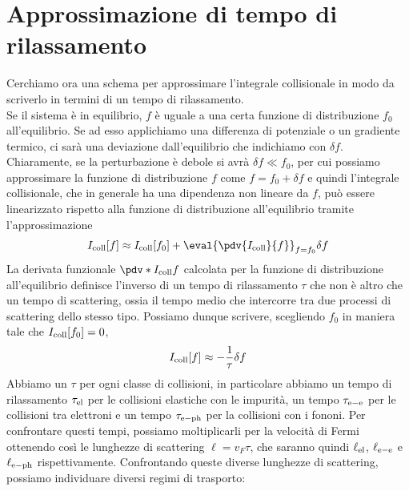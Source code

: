 \section{Approssimazione di tempo di rilassamento}
Cerchiamo ora una schema per approssimare l'integrale collisionale in modo da scriverlo in termini di un tempo di rilassamento.\\
Se il sistema è in equilibrio, $f$ è uguale a una certa funzione di distribuzione $f_0$ all'equilibrio. Se ad esso applichiamo una differenza di potenziale o un gradiente termico, ci sarà una deviazione dall'equilibrio che indichiamo con $\delta f$. Chiaramente, se la perturbazione è debole si avrà $\delta f \ll f_0$, per cui possiamo approssimare la funzione di distribuzione $f$ come $f=f_0 + \delta f$ e quindi l'integrale collisionale, che in generale ha una dipendenza non lineare da $f$, può essere linearizzato rispetto alla funzione di distribuzione all'equilibrio tramite l'approssimazione
\begin{equation*}
    I_{\rm coll}[f]
    \approx I_{\rm coll}[f_0] + \eval{\pdv{I_{\rm coll}}{f} }_{f=f_0} \delta f
\end{equation*}
La derivata funzionale $\pdv*{I_{\rm coll}}{f}$ calcolata per la funzione di distribuzione all'equilibrio definisce l'inverso di un tempo di rilassamento $\tau$ che non è altro che un tempo di scattering, ossia il tempo medio che intercorre tra due processi di scattering dello stesso tipo. Possiamo dunque scrivere, scegliendo $f_0$ in maniera tale che $I_{\rm coll}[f_0]=0$,
\begin{equation*}
    I_{\rm coll}[f]
    \approx -\frac{1}{\tau} \delta f
\end{equation*}
Abbiamo un $\tau$ per ogni classe di collisioni, in particolare abbiamo un tempo di rilassamento $\tau_{\rm el}$ per le collisioni elastiche con le impurità, un tempo $\tau_{\rm e-e}$ per le collisioni tra elettroni e un tempo $\tau_{\rm e-ph}$ per la collisioni con i fononi. Per confrontare questi tempi, possiamo moltiplicarli per la velocità di Fermi ottenendo così le lunghezze di scattering $\ell=v_F \tau$, che saranno quindi $\ell_{\rm el}$, $\ell_{\rm e-e}$ e $\ell_{\rm e-ph}$ rispettivamente. Confrontando queste diverse lunghezze di scattering, possiamo individuare diversi regimi di trasporto:
